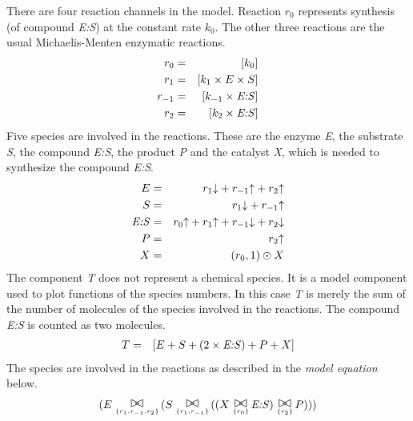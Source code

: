 


%
There are four reaction channels in the model.  Reaction $r_0$
represents synthesis (of compound \textit{E:S}) at the 
constant rate $k_0$.  The other three reactions are the usual
Michaelis-Menten enzymatic reactions.
%
\begin{eqnarray*}
r_0 & = & [ k_0 ]\\%
r_1 & = & [ k_1 \times  E \times  S ]\\%
r_{-1} & = & [ k_{-1} \times  \hbox{\textit{E:S}} ]\\%
r_2 & = & [ k_2 \times  \hbox{\textit{E:S}} ]\\%
\end{eqnarray*}
%
Five species are involved in the reactions.  These are the
enzyme \textit{E}, the substrate \textit{S}, the compound
\textit{E:S}, the product \textit{P} and the catalyst
\textit{X}, which is needed to synthesize the compound
\textit{E:S}.
%
\begin{eqnarray*}
E & = & r_1{\downarrow} +  r_{-1}{\uparrow}  +  r_2{\uparrow} \\%
S & = & r_1{\downarrow}  +  r_{-1}{\uparrow} \\%
\hbox{\textit{E:S}} & = & r_0{\uparrow} + r_1{\uparrow}  +  r_{-1}{\downarrow}  +  r_2{\downarrow} \\%
P & = & r_2{\uparrow} \\%
X & = & (r_0, 1) \odot  X\\%
\end{eqnarray*}
%
The component \textit{T} does not represent a chemical species.  
It is a model component used to plot functions of the species
numbers.  In this case \textit{T} is merely the sum of the number of 
molecules of the species involved in the reactions.  The compound
\textit{E:S} is counted as two molecules.
%
\begin{eqnarray*}
T & = & [ E + S + (2 \times  \hbox{\textit{E:S}}) + P + X ]\\%
\end{eqnarray*}
%
The species are involved in the reactions as described 
in the \emph{model equation} below.
%
\begin{eqnarray*}
(E \sync{\{r_1, r_{-1}, r_2\}} (S \sync{\{r_1, r_{-1}\}} ((X \sync{\{r_0\}} \hbox{\textit{E:S}}) \sync{\{r_2\}} P)))%
\end{eqnarray*}
